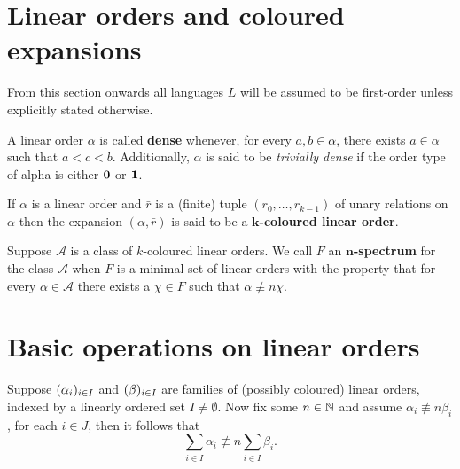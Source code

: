 \section{Linear orders and coloured expansions}

\begin{assn}
	From this section onwards all languages $L$ will be assumed to be first-order unless explicitly stated otherwise.
\end{assn}

\begin{dfn}
	A linear order $\alpha$ is called \textbf{dense} whenever, for every $a,b\in\alpha$, there exists $a\in\alpha$ such that $a<c<b$.  Additionally, $\alpha$ is said to be \textit{trivially dense} if the order type of alpha is either $\mathbf{0}$ or $\mathbf{1}$.
\end{dfn}

\begin{dfn}
	If $\alpha$ is a linear order and $\bar{r}$ is a (finite) tuple $(r_0,\dotsc,r_{k-1})$ of unary relations on $\alpha$ then the expansion $(\alpha,\bar{r})$ is said to be a $\mathbf{k}$\textbf{-coloured linear order}.
\end{dfn}

\begin{dfn}[Spectrum]
	Suppose $\mathcal{A}$ is a class of $k$-coloured linear orders.  We call $F$ an $\mathbf{n}$\textbf{-spectrum} for the class $\mathcal{A}$ when $F$ is a minimal set of linear orders with the property that for every $\alpha\in\mathcal{A}$ there exists a $\chi\in F$ such that $\alpha\nequiv{n}\chi$.
\end{dfn}


\section{Basic operations on linear orders}

\begin{lem}\label{lem:fvsum}
	Suppose $(\alpha_i)_{i\in I}$ and $(\beta)_{i\in I}$ are families of (possibly coloured) linear orders, indexed by a linearly ordered set $I\neq\emptyset$.  Now fix some $n\in\mathbb{N}$ and assume $\alpha_i\nequiv{n}\beta_i$, for each $i\in J$, then it follows that
	\begin{equation}
		\sum_{i\in I}\alpha_i\nequiv{n}\sum_{i\in I}\beta_i.
	\end{equation}
\end{lem}


